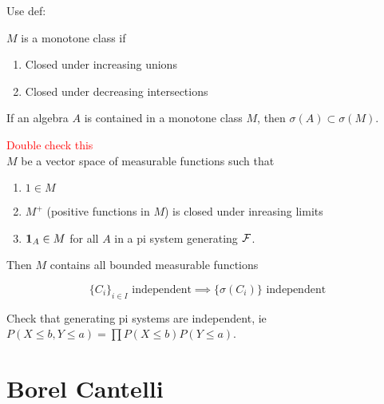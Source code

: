 \documentclass{article}
\newcommand\myworries[1]{\textcolor{red}{#1}}
\begin{document}
\begin{theorem}
Use def:
\begin{definition}
$M$ is a monotone class if 
\begin{enumerate}
	\item Closed under increasing unions
	\item Closed under decreasing intersections
\end{enumerate}
\end{definition}
If an algebra $A$ is contained in a monotone class $M$, then $\sigma(A) \subset \sigma(M)$.
\end{theorem}
\begin{theorem}
\myworries{Double check this}\\
$M$ be a vector space of measurable functions such that 
\begin{enumerate}
	\item $1 \in M$
	\item $M^+$ (positive functions in $M$) is closed under inreasing limits 
	\item $\boldsymbol{1}_A \in M$ for all $A$ in a pi system generating $\mathcal F$.
\end{enumerate}
Then $M$ contains all bounded measurable functions
\end{theorem}



\begin{theorem}
$$\{C_i\}_{i\in I} \text { independent} \implies \{\sigma(C_i)\} \text{ independent} $$
\begin{example}
Check that generating pi systems are independent, ie $P(X\leq b, Y\leq a) = \prod P(X\leq b) P(Y\leq a)$. 
\end{example}

\end{theorem}

\section{Borel Cantelli} 
\end{document}
